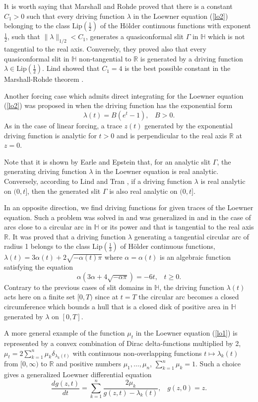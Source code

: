 \documentclass[
11pt,%
tightenlines,%
twoside,%
onecolumn,%
nofloats,%
nobibnotes,%
nofootinbib,%
superscriptaddress,%
noshowpacs,%
centertags]%
{revtex4}
\begin{document}
It is worth saying that Marshall and Rohde \cite{MarRoh} proved that there is a constant $C_1>0$ such that every driving function $\lambda$ in the Loewner equation (\ref{lo2}) belonging to the class $\text{Lip}(\frac{1}{2})$ of the H\"older continuous functions with exponent $\frac{1}{2}$, such that $\|\lambda\|_{1/2}<C_1$, generates a quasiconformal slit $\Gamma$ in $\mathbb H$ which is not tangential to the real axis. Conversely, they proved also that every quasiconformal slit in $\mathbb H$ non-tangential to $\mathbb R$ is generated by a driving function $\lambda\in\text{Lip}(\frac{1}{2})$. Lind \cite{Lin} showed that $C_1=4$ is the best possible constant in the Marshall-Rohde theorem \cite{MarRoh}.

Another forcing case which admits direct integrating for the Loewner equation (\ref{lo2}) was proposed in \cite{ProZak} when the driving function has the exponential form $$\lambda(t)=B(e^t-1),\;\;\;B>0.$$ As in the case of linear forcing, a trace $z(t)$ generated by the exponential driving function is analytic for $t>0$ and is perpendicular to the real axis $\mathbb R$ at $z=0$.

Note that it is shown by Earle and Epstein \cite{EarEps} that, for an analytic slit $\Gamma$, the generating driving function $\lambda$ in the Loewner equation is real analytic. Conversely, according to Lind and Tran \cite{LinTra}, if a driving function $\lambda$ is real analytic on $(0,t]$, then the generated slit $\Gamma$ is also real analytic on $(0,t]$.

In an opposite direction, we find driving functions for given traces of the Loewner equation. Such a problem was solved in \cite{ProVas} and was generalized in \cite{LauWu} and \cite{WuJiaDon} in the case of arcs close to a circular arc in $\mathbb H$ or its power and that is tangential to the real axis $\mathbb R$. It was proved that a driving function $\lambda$ generating a tangential circular arc of radius 1 belongs to the class $\text{Lip}(\frac{1}{3})$ of H\"older continuous functions, $\lambda(t)=3\alpha(t)+2\sqrt{-\alpha(t)\pi}$ where $\alpha=\alpha(t)$ is an algebraic function satisfying the equation $$\alpha(3\alpha+4\sqrt{-\alpha\pi})=-6t,\;\;\;t\geq0.$$ Contrary to the previous cases of slit domains in $\mathbb H$, the driving function $\lambda(t)$ acts here on a finite set $[0,T)$ since at $t=T$ the circular arc becomes a closed circumference which bounds a hull that is a closed disk of positive area in $\mathbb H$ generated by $\lambda$ on $[0,T]$.

A more general example of the function $\mu_t$ in the Loewner equation (\ref{lo1}) is represented by a convex combination of Dirac delta-functions multiplied by 2, $\mu_t=2\sum_{k=1}^n\mu_k\delta_{\lambda_k(t)}$ with continuous non-overlapping functions $t\mapsto\lambda_k(t)$ from $[0,\infty)$ to $\mathbb R$ and positive numbers $\mu_1,\dots,\mu_n$, $\sum_{k=1}^n\mu_k=1$. Such a choice gives a generalized Loewner differential equation
\begin{equation}
\frac{dg(z,t)}{dt}=\sum_{k=1}^n\frac{2\mu_k}{g(z,t)-\lambda_k(t)},\;\;\;g(z,0)=z. \label{lo3}
\end{equation}
\end{document}

